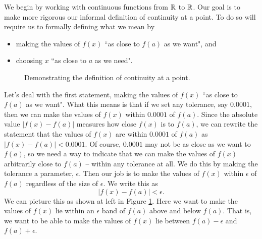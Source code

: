 We begin by working with continuous functions from $\mathbb{R}$ to $\mathbb{R}$. Our goal is to make more rigorous our informal definition of continuity at a point. To do so will require us to formally defining what we mean by 
\begin{itemize}
\item making the values of $f(x)$ ``as close to $f(a)$ as we want", and
\item choosing $x$ ``as close to $a$ as we need".
\end{itemize}

\begin{figure}[ht]
\begin{center}
 \hspace{0.75in} 
\caption{Demonstrating the definition of continuity at a point.}
\label{F:Continuity}
\end{center}
\end{figure}
Let's deal with the first statement, making the values of $f(x)$ ``as close to $f(a)$ as we want". What this means is that if we set any tolerance, say $0.0001$, then we can make the values of $f(x)$ within $0.0001$ of $f(a)$. Since the absolute value $| f(x)-f(a) |$ measures how close $f(x)$ is to $f(a)$, we can rewrite the statement that the values of $f(x)$ are within $0.0001$ of $f(a)$ as $| f(x) - f(a) | < 0.0001$. Of course, $0.0001$ may not be as close as we want to $f(a)$, so we need a way to indicate that we can make the values of $f(x)$ arbitrarily close to $f(a)$ -- within any tolerance at all. We do this by making the tolerance a parameter, $\epsilon$. Then our job is to make the values of $f(x)$ within $\epsilon$ of $f(a)$ regardless of the size of $\epsilon$. We write this as 
\[| f(x) - f(a) | < \epsilon.\]
We can picture this as shown at left in Figure \ref{F:Continuity}. Here we want to make the values of $f(x)$ lie within an $\epsilon$ band of $f(a)$ above and below $f(a)$. That is, we want to be able to make the values of $f(x)$ lie between $f(a)-\epsilon$ and $f(a)+\epsilon$. 

